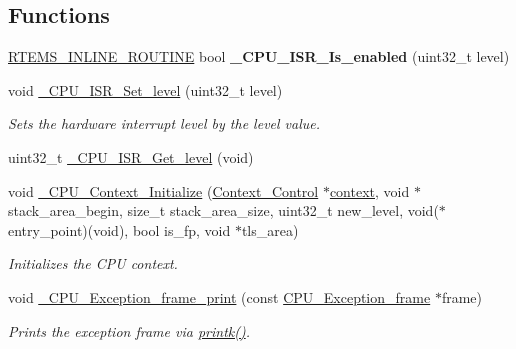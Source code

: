 \subsection*{Functions}
\begin{DoxyCompactItemize}
\item 
\mbox{\label{group__RTEMSScoreCPUEpiphany_ga5254669b54a06e96ebb585fd50a02c4d}} 
\mbox{\hyperlink{group__RTEMSScoreBaseDefs_gac216239df231d5dbd15e3520b0b9313f}{R\+T\+E\+M\+S\+\_\+\+I\+N\+L\+I\+N\+E\+\_\+\+R\+O\+U\+T\+I\+NE}} bool {\bfseries \+\_\+\+C\+P\+U\+\_\+\+I\+S\+R\+\_\+\+Is\+\_\+enabled} (uint32\+\_\+t level)
\item 
void \mbox{\hyperlink{group__RTEMSScoreCPUEpiphany_ga43820ba3d51d7a699c22fce8cac93ef1}{\+\_\+\+C\+P\+U\+\_\+\+I\+S\+R\+\_\+\+Set\+\_\+level}} (uint32\+\_\+t level)
\begin{DoxyCompactList}\small\item\em Sets the hardware interrupt level by the level value. \end{DoxyCompactList}\item 
uint32\+\_\+t \mbox{\hyperlink{group__RTEMSScoreCPUEpiphany_ga1d9dcab9170d532b6634a5620385adbd}{\+\_\+\+C\+P\+U\+\_\+\+I\+S\+R\+\_\+\+Get\+\_\+level}} (void)
\item 
void \mbox{\hyperlink{group__RTEMSScoreCPUEpiphany_ga7b9d8ca4fc632d4e2e0ea4415ac3b868}{\+\_\+\+C\+P\+U\+\_\+\+Context\+\_\+\+Initialize}} (\mbox{\hyperlink{structContext__Control}{Context\+\_\+\+Control}} $\ast$\mbox{\hyperlink{sun4u_2tte_8h_a9b4a99475e2709333b8e5d70483173f1}{context}}, void $\ast$stack\+\_\+area\+\_\+begin, size\+\_\+t stack\+\_\+area\+\_\+size, uint32\+\_\+t new\+\_\+level, void($\ast$entry\+\_\+point)(void), bool is\+\_\+fp, void $\ast$tls\+\_\+area)
\begin{DoxyCompactList}\small\item\em Initializes the C\+PU context. \end{DoxyCompactList}\item 
void \mbox{\hyperlink{group__RTEMSScoreCPUEpiphany_gaa34a35de496258577c1454ba1ee07ce0}{\+\_\+\+C\+P\+U\+\_\+\+Exception\+\_\+frame\+\_\+print}} (const \mbox{\hyperlink{structCPU__Exception__frame}{C\+P\+U\+\_\+\+Exception\+\_\+frame}} $\ast$frame)
\begin{DoxyCompactList}\small\item\em Prints the exception frame via \mbox{\hyperlink{bspIo_8h_a380cfecc8035cec8a13b68c0cb90f32f}{printk()}}. \end{DoxyCompactList}\item 

\end{DoxyCompactItemize}
